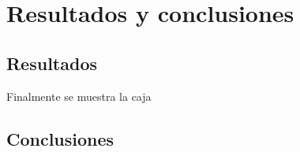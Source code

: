 \chapter{Resultados y conclusiones}\label{chp-07}

\section{Resultados}

Finalmente se muestra la caja  

\section{Conclusiones}

